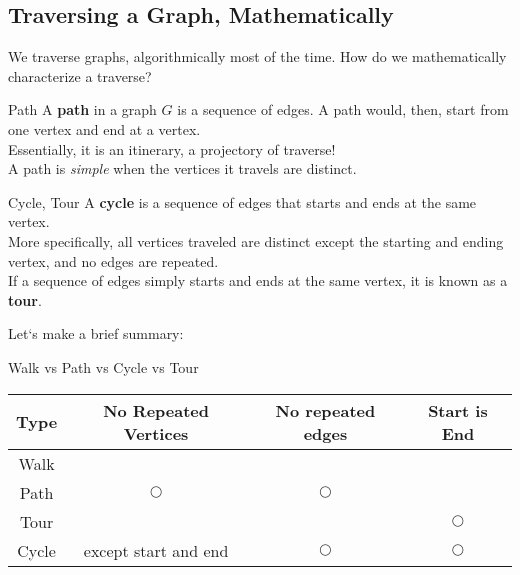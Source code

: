 \subsection{Traversing a Graph, Mathematically}
We traverse graphs, algorithmically most of the time. How do we mathematically characterize a traverse?
\begin{ln-define}{Path}{}
    A \textbf{path} in a graph $G$ is a sequence of edges. A path would, then, start from one vertex and end at a vertex. \\
    Essentially, it is an itinerary, a projectory of traverse! \\
    A path is \textit{simple} when the vertices it travels are distinct.
\end{ln-define}
\begin{ln-define}{Cycle, Tour}{}
    A \textbf{cycle} is a sequence of edges that starts and ends at the same vertex. \\
    More specifically, all vertices traveled are distinct except the starting and ending vertex, and no edges are repeated. \\
    If a sequence of edges simply starts and ends at the same vertex, it is known as a \textbf{tour}.
\end{ln-define}
Let`s make a brief summary:
\begin{ln-fig}{Walk vs Path vs Cycle vs Tour}{}
    \begin{center}
        \begin{tabular}{|c|ccc|}
            Type & No Repeated Vertices & No repeated edges & Start is End \\
            \hline
            Walk & & & \\
            Path & $\bigcirc$ & $\bigcirc$ & \\
            Tour & & & $\bigcirc$ \\
            Cycle & except start and end & $\bigcirc$ & $\bigcirc$
        \end{tabular}
    \end{center}
\end{ln-fig}


